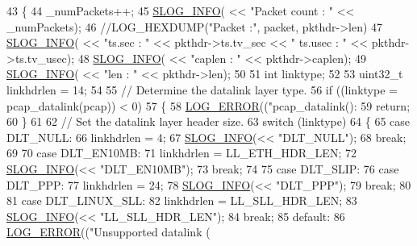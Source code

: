 \begin{DoxyCode}
43 \{
44     \_numPackets++;
45     \hyperlink{_logger_8h_a119c1c29ba35a8db38e2358e41167282}{SLOG\_INFO}( << \textcolor{stringliteral}{"Packet count : "} << \_numPackets);
46     \textcolor{comment}{//LOG\_HEXDUMP("Packet :", packet, pkthdr->len)}
47     \hyperlink{_logger_8h_a119c1c29ba35a8db38e2358e41167282}{SLOG\_INFO}( << \textcolor{stringliteral}{"ts.sec : "} << pkthdr->ts.tv\_sec << \textcolor{stringliteral}{" ts.usec : "} << pkthdr->ts.tv\_usec);
48     \hyperlink{_logger_8h_a119c1c29ba35a8db38e2358e41167282}{SLOG\_INFO}( << \textcolor{stringliteral}{"caplen : "} << pkthdr->caplen);
49     \hyperlink{_logger_8h_a119c1c29ba35a8db38e2358e41167282}{SLOG\_INFO}( << \textcolor{stringliteral}{"len : "} << pkthdr->len);
50 
51     \textcolor{keywordtype}{int} linktype;
52 
53     uint32\_t linkhdrlen = 14;
54  
55     \textcolor{comment}{// Determine the datalink layer type.}
56     \textcolor{keywordflow}{if} ((linktype = pcap\_datalink(pcap)) < 0)
57     \{
58         \hyperlink{_logger_8h_aa2ffef3c03ca18789b5d04ac9b260128}{LOG\_ERROR}((\textcolor{stringliteral}{"pcap\_datalink(): %
59         \textcolor{keywordflow}{return};
60     \}
61  
62     \textcolor{comment}{// Set the datalink layer header size.}
63     \textcolor{keywordflow}{switch} (linktype)
64     \{
65     \textcolor{keywordflow}{case} DLT\_NULL:
66         linkhdrlen = 4;
67         \hyperlink{_logger_8h_a119c1c29ba35a8db38e2358e41167282}{SLOG\_INFO}(<< \textcolor{stringliteral}{"DLT\_NULL"});
68         \textcolor{keywordflow}{break};
69  
70     \textcolor{keywordflow}{case} DLT\_EN10MB:
71         linkhdrlen = LL\_ETH\_HDR\_LEN;
72         \hyperlink{_logger_8h_a119c1c29ba35a8db38e2358e41167282}{SLOG\_INFO}(<< \textcolor{stringliteral}{"DLT\_EN10MB"});
73         \textcolor{keywordflow}{break};
74  
75     \textcolor{keywordflow}{case} DLT\_SLIP:
76     \textcolor{keywordflow}{case} DLT\_PPP:
77         linkhdrlen = 24;
78         \hyperlink{_logger_8h_a119c1c29ba35a8db38e2358e41167282}{SLOG\_INFO}(<< \textcolor{stringliteral}{"DLT\_PPP"});
79         \textcolor{keywordflow}{break};
80  
81     \textcolor{keywordflow}{case} DLT\_LINUX\_SLL:
82         linkhdrlen = LL\_SLL\_HDR\_LEN;
83         \hyperlink{_logger_8h_a119c1c29ba35a8db38e2358e41167282}{SLOG\_INFO}(<< \textcolor{stringliteral}{"LL\_SLL\_HDR\_LEN"});
84         \textcolor{keywordflow}{break};
85     \textcolor{keywordflow}{default}:
86         \hyperlink{_logger_8h_aa2ffef3c03ca18789b5d04ac9b260128}{LOG\_ERROR}((\textcolor{stringliteral}{"Unsupported datalink (%
}}
\end{DoxyCode}
